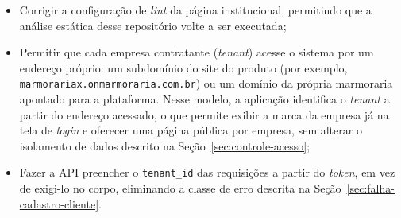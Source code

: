 \begin{itemize}
  \item Corrigir a configuração de \textit{lint} da página institucional, permitindo que a análise estática desse repositório volte a ser executada;
  \item Permitir que cada empresa contratante (\textit{tenant}) acesse o sistema por um endereço próprio: um subdomínio do site do produto (por exemplo, \texttt{marmorariax.\allowbreak{}onmarmoraria.\allowbreak{}com.br}) ou um domínio da própria marmoraria apontado para a plataforma. Nesse modelo, a aplicação identifica o \textit{tenant} a partir do endereço acessado, o que permite exibir a marca da empresa já na tela de \textit{login} e oferecer uma página pública por empresa, sem alterar o isolamento de dados descrito na Seção~\ref{sec:controle-acesso};
  \item Fazer a API preencher o \texttt{tenant\_id} das requisições a partir do \textit{token}, em vez de exigi-lo no corpo, eliminando a classe de erro descrita na Seção~\ref{sec:falha-cadastro-cliente}.
\end{itemize}
